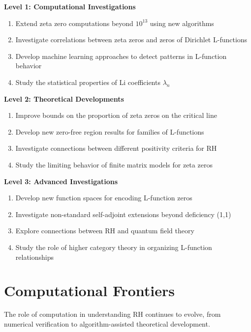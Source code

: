 \begin{problem_set}

\textbf{Level 1: Computational Investigations}
\begin{enumerate}
\item Extend zeta zero computations beyond $10^{13}$ using new algorithms
\item Investigate correlations between zeta zeros and zeros of Dirichlet L-functions
\item Develop machine learning approaches to detect patterns in L-function behavior
\item Study the statistical properties of Li coefficients $\lambda_n$
\end{enumerate}

\textbf{Level 2: Theoretical Developments}
\begin{enumerate}
\item Improve bounds on the proportion of zeta zeros on the critical line
\item Develop new zero-free region results for families of L-functions
\item Investigate connections between different positivity criteria for RH
\item Study the limiting behavior of finite matrix models for zeta zeros
\end{enumerate}

\textbf{Level 3: Advanced Investigations}
\begin{enumerate}
\item Develop new function spaces for encoding L-function zeros
\item Investigate non-standard self-adjoint extensions beyond deficiency (1,1)
\item Explore connections between RH and quantum field theory
\item Study the role of higher category theory in organizing L-function relationships
\end{enumerate}
\end{problem_set}

\section{Computational Frontiers}
\label{sec:computational_frontiers}

The role of computation in understanding RH continues to evolve, from numerical verification to algorithm-assisted theoretical development.

